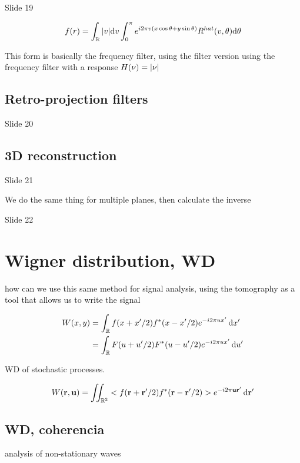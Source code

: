 \documentclass[../main/main.tex]{subfiles}
\begin{document}
Slide 19

\begin{equation}
f(r) = \int_{\mathbb{R}} \abs{v} \dd v \int_{0}^{\pi}e^{i2\pi v(x \cos \theta + y \sin \theta)} R^{hat}(v, \theta) \dd \theta
\end{equation}

This form is basically the frequency filter, using the filter version using the frequency filter with a response $H(\nu) = \abs{\nu}$


\subsection{Retro-projection filters}

Slide 20

\subsection{3D reconstruction}

Slide 21

We do the same thing for multiple planes, then calculate the inverse

Slide 22

\section{Wigner distribution, WD}

how can we use this same method for signal analysis, using the tomography as a tool that allows us to write the signal

\begin{align*}
W(x,y) &= \int_{\mathbb{R}} f (x + x'/2) f^{*}(x - x'/2) e^{-i2\pi u x'} \dd{x'}\\
&= \int_{\mathbb{R}} F (u + u'/2) F^{*}(u - u'/2) e^{-i2\pi u x'} \dd{u'}\\
\end{align*}

WD of stochastic processes.

\begin{equation}
W(\vb{r}, \vb{u}) = \iint_{\mathbb{R}^{2}}< f (\vb{r} + \vb{r'}/2) f^{*}(\vb{r} - \vb{r'}/2)>e^{-i2\pi \vb{u} \vb{r'}} \dd{\vb{r'}}
\end{equation}

\subsection{WD, coherencia}
analysis of non-stationary waves
\end{document}
